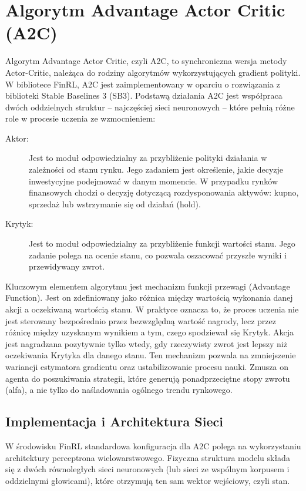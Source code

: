 \section{Algorytm Advantage Actor Critic (A2C)}

Algorytm Advantage Actor Critic, czyli A2C, to synchroniczna wersja metody Actor-Critic, należąca do rodziny algorytmów wykorzystujących gradient polityki. W bibliotece FinRL, A2C jest zaimplementowany w oparciu o rozwiązania z biblioteki Stable Baselines 3 (SB3). Podstawą działania A2C jest współpraca dwóch oddzielnych struktur – najczęściej sieci neuronowych – które pełnią różne role w procesie uczenia ze wzmocnieniem:

\begin{description}
    \item[Aktor:] Jest to moduł odpowiedzialny za przybliżenie polityki działania w zależności od stanu rynku. Jego zadaniem jest określenie, jakie decyzje inwestycyjne podejmować w danym momencie. W przypadku rynków finansowych chodzi o decyzję dotyczącą rozdysponowania aktywów: kupno, sprzedaż lub wstrzymanie się od działań (hold).
    
    \item[Krytyk:] Jest to moduł odpowiedzialny za przybliżenie funkcji wartości stanu. Jego zadanie polega na ocenie stanu, co pozwala oszacować przyszłe wyniki i przewidywany zwrot.
\end{description}

Kluczowym elementem algorytmu jest mechanizm funkcji przewagi (Advantage Function). Jest on zdefiniowany jako różnica między wartością wykonania danej akcji a oczekiwaną wartością stanu. W praktyce oznacza to, że proces uczenia nie jest sterowany bezpośrednio przez bezwzględną wartość nagrody, lecz przez różnicę między uzyskanym wynikiem a tym, czego spodziewał się Krytyk. Akcja jest nagradzana pozytywnie tylko wtedy, gdy rzeczywisty zwrot jest lepszy niż oczekiwania Krytyka dla danego stanu. Ten mechanizm pozwala na zmniejszenie wariancji estymatora gradientu oraz ustabilizowanie procesu nauki. Zmusza on agenta do poszukiwania strategii, które generują ponadprzeciętne stopy zwrotu (alfa), a nie tylko do naśladowania ogólnego trendu rynkowego.

\subsection{Implementacja i Architektura Sieci}

W środowisku FinRL standardowa konfiguracja dla A2C polega na wykorzystaniu architektury perceptrona wielowarstwowego. Fizyczna struktura modelu składa się z dwóch równoległych sieci neuronowych (lub sieci ze wspólnym korpusem i oddzielnymi głowicami), które otrzymują ten sam wektor wejściowy, czyli stan.

